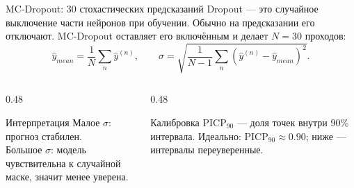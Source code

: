 \documentclass[aspectratio=169,10pt]{beamer}
\begin{document}
\begin{frame}{MC-Dropout: 30 стохастических предсказаний}
  \small
  Dropout — это случайное выключение части нейронов при обучении.
  Обычно на предсказании его отключают. MC-Dropout оставляет его включённым
  и делает $N=30$ проходов:
  \[
    \hat{y}_{mean}=\frac{1}{N}\sum_n \hat{y}^{(n)},\qquad
    \sigma=\sqrt{\frac{1}{N-1}\sum_n(\hat{y}^{(n)}-\hat{y}_{mean})^2}.
  \]
  \begin{columns}[T,onlytextwidth]
    \begin{column}{0.48\textwidth}
      \begin{block}{Интерпретация}
        \scriptsize
        Малое $\sigma$: прогноз стабилен.\\
        Большое $\sigma$: модель чувствительна к случайной маске, значит менее уверена.
      \end{block}
    \end{column}
    \begin{column}{0.48\textwidth}
      \begin{block}{Калибровка}
        \scriptsize
        PICP$_{90}$ — доля точек внутри 90\% интервала. Идеально: PICP$_{90}\approx0.90$; ниже — интервалы переуверенные.
      \end{block}
    \end{column}
  \end{columns}
\end{frame}
\end{document}

